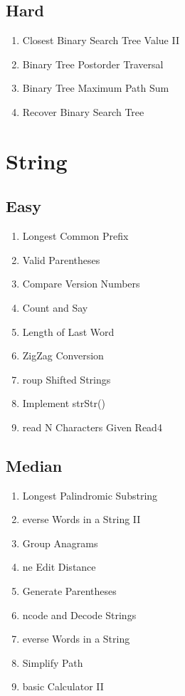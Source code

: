\documentclass[DIV=calc, paper=a4, fontsize=11pt, twocolumn]{scrartcl}	 %
\begin{document}
\subsection*{Hard}
\begin{enumerate}
\item Closest Binary Search Tree Value II    \cite{272}
\item Binary Tree Postorder Traversal \cite{145}
\item Binary Tree Maximum Path Sum   \cite{124}
\item  Recover Binary Search Tree  \cite{099}
\end{enumerate}


\section*{String}
\subsection*{Easy}
\begin{enumerate}
\item Longest Common Prefix \cite{014} 
\item Valid Parentheses   \cite{020}
\item Compare Version Numbers \cite{165}
\item Count and Say  \cite{038}
\item Length of Last Word \cite{058}
\item ZigZag Conversion \cite{006}
\item roup Shifted Strings \cite{249}
\item Implement strStr()  \cite{028}
\item read N Characters Given Read4 \cite{157}
\end{enumerate}

\subsection*{Median}
\begin{enumerate}
\item  Longest Palindromic Substring \cite{005}
\item everse Words in a String II  \cite{186}
\item Group Anagrams  \cite{049}
\item ne Edit Distance \cite{161}
\item Generate Parentheses  \cite{022}
\item ncode and Decode Strings \cite{271}
\item everse Words in a String \cite{151}
\item Simplify Path   \cite{071}
\item basic Calculator II \cite{227}
\end{enumerate}
\end{document}
